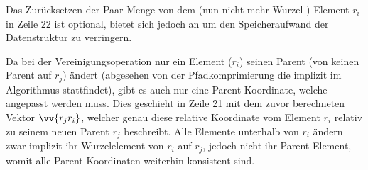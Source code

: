 \documentclass{whswinvcbook}
\begin{document}
Das Zurücksetzen der Paar-Menge von dem (nun nicht mehr Wurzel-) Element $r_i$ in Zeile 22 ist optional, bietet sich jedoch an um den Speicheraufwand der Datenstruktur zu verringern.

Da bei der Vereinigungsoperation nur ein Element ($r_i$) seinen Parent (von keinen Parent auf $r_j$) ändert (abgesehen von der Pfadkomprimierung die implizit im Algorithmus stattfindet), gibt es auch nur eine Parent-Koordinate, welche angepasst werden muss. Dies geschieht in Zeile 21 mit dem zuvor berechneten Vektor $\vv{r_j r_i}$, welcher genau diese relative Koordinate vom Element $r_i$ relativ zu seinem neuen Parent $r_j$ beschreibt. Alle Elemente unterhalb von $r_i$ ändern zwar implizit ihr Wurzelelement von $r_i$ auf $r_j$, jedoch nicht ihr Parent-Element, womit alle Parent-Koordinaten weiterhin konsistent sind.
\end{document}
